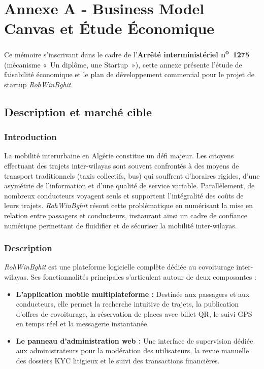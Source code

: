 \appendix
\chapter{Annexe A - Business Model Canvas et Étude Économique}
\label{app:business}

Ce mémoire s'inscrivant dans le cadre de l'\textbf{Arrêté interministériel n\textsuperscript{o}~1275} (mécanisme «~Un diplôme, une Startup~»), cette annexe présente l'étude de faisabilité économique et le plan de développement commercial pour le projet de startup \textit{RohWinBghit}.

\section{Description et marché cible}

\subsection{Introduction}

La mobilité interurbaine en Algérie constitue un défi majeur. Les citoyens effectuant des trajets inter-wilayas sont souvent confrontés à des moyens de transport traditionnels (taxis collectifs, bus) qui souffrent d'horaires rigides, d'une asymétrie de l'information et d'une qualité de service variable. Parallèlement, de nombreux conducteurs voyagent seuls et supportent l'intégralité des coûts de leurs trajets. \textit{RohWinBghit} résout cette problématique en numérisant la mise en relation entre passagers et conducteurs, instaurant ainsi un cadre de confiance numérique permettant de fluidifier et de sécuriser la mobilité inter-wilayas.

\subsection{Description}

\textit{RohWinBghit} est une plateforme logicielle complète dédiée au covoiturage inter-wilayas. Ses fonctionnalités principales s'articulent autour de deux composantes :
\begin{itemize}
    \item \textbf{L'application mobile multiplateforme :} Destinée aux passagers et aux conducteurs, elle permet la recherche intuitive de trajets, la publication d'offres de covoiturage, la réservation de places avec billet QR, le suivi GPS en temps réel et la messagerie instantanée. 
    \item \textbf{Le panneau d'administration web :} Une interface de supervision dédiée aux administrateurs pour la modération des utilisateurs, la revue manuelle des dossiers KYC litigieux et le suivi des transactions financières.
\end{itemize}

